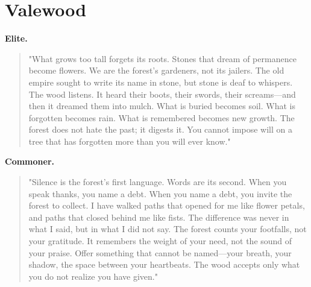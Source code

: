 \section*{Valewood}
\textbf{Elite.}
\begin{quote}
"What grows too tall forgets its roots. Stones that dream of permanence become flowers. We are the forest's gardeners, not its jailers. The old empire sought to write its name in stone, but stone is deaf to whispers. The wood listens. It heard their boots, their swords, their screams—and then it dreamed them into mulch. What is buried becomes soil. What is forgotten becomes rain. What is remembered becomes new growth. The forest does not hate the past; it digests it. You cannot impose will on a tree that has forgotten more than you will ever know."
\end{quote}
\textbf{Commoner.}
\begin{quote}
"Silence is the forest's first language. Words are its second. When you speak thanks, you name a debt. When you name a debt, you invite the forest to collect. I have walked paths that opened for me like flower petals, and paths that closed behind me like fists. The difference was never in what I said, but in what I did not say. The forest counts your footfalls, not your gratitude. It remembers the weight of your need, not the sound of your praise. Offer something that cannot be named—your breath, your shadow, the space between your heartbeats. The wood accepts only what you do not realize you have given."
\end{quote}

